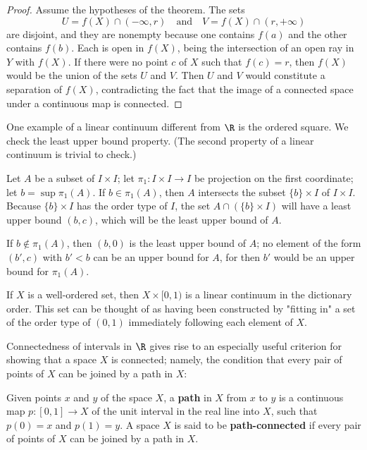 \begin{proof}
Assume the hypotheses of the theorem. The sets
\[U=f(X)\cap(-\infty,r)\quad\text{and}\quad V=f(X)\cap(r,+\infty)\]
are disjoint, and they are nonempty because one contains $f(a)$ and the other contains $f(b)$. Each is open in $f(X)$, being the intersection of an open ray in $Y$ with $f(X)$. If there were no point $c$ of $X$ such that $f(c)=r$, then $f(X)$ would be the union of the sets $U$ and $V$. Then $U$ and $V$ would constitute a separation of $f(X)$, contradicting the fact that the image of a connected space under a continuous map is connected.
\end{proof}
\begin{example}
One example of a linear continuum different from $\R$ is the ordered square. We check the least upper bound property. (The second property of a linear continuum is trivial to check.)\par
Let $A$ be a subset of $I\times I$; let $\pi_1:I\times I\to I$ be projection on the first coordinate; let $b=\sup\pi_1(A)$. If $b\in\pi_1(A)$, then $A$ intersects the subset $\{b\}\times I$ of $I\times I$. Because $\{b\}\times I$ has the order type of $I$, the set $A\cap (\{b\}\times I)$ will have a least upper bound $(b,c)$, which will be the least upper bound of $A$.\par
If $b\notin\pi_1(A)$, then $(b,0)$ is the least upper bound of $A$; no element of the form $(b',c)$ with $b'<b$ can be an upper bound for $A$, for then $b'$ would be an upper bound for $\pi_1(A)$.
\end{example}
\begin{example}
If $X$ is a well-ordered set, then $X\times[0,1)$ is a linear continuum in the dictionary order. This set can be thought of as having been constructed by "fitting in" a set of the order type of $(0,1)$ immediately following each element of $X$.
\end{example}
Connectedness of intervals in $\R$ gives rise to an especially useful criterion for showing that a space $X$ is connected; namely, the condition that every pair of points of $X$ can be joined by a path in $X$:
\begin{definition}
Given points $x$ and $y$ of the space $X$, a \textbf{path} in $X$ from $x$ to $y$ is a continuous map $p:[0,1]\to X$ of the unit interval in the real line into $X$, such that $p(0)=x$ and $p(1)=y$. A space $X$ is said to be \textbf{path-connected} if every pair of points of $X$ can be joined by a path in $X$.
\end{definition}
